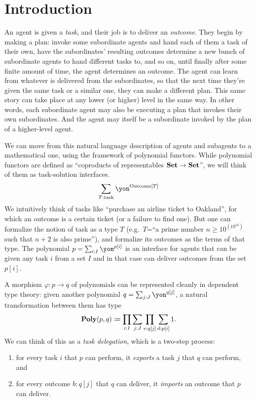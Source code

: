 \chapter{Introduction}\label{sec:intro}

An agent is given a \emph{task}, and their job is to deliver an \emph{outcome}. They begin by making a plan: invoke some subordinate agents and hand each of them a task of their own, have the subordinates' resulting outcomes determine a new bunch of subordinate agents to hand different tasks to, and so on, until finally after some finite amount of time, the agent determines an outcome. The agent can learn from whatever is delivered from the subordinates, so that the next time they're given the same task or a similar one, they can make a different plan. This same story can take place at any lower (or higher) level in the same way. In other words, each subordinate agent may also be executing a plan that invokes their own subordinates. And the agent may itself be a subordinate invoked by the plan of a higher-level agent.

We can move from this natural language description of agents and subagents to a mathematical one, using the framework of polynomial functors. While polynomial functors are defined as ``coproducts of representables $\mathbf{Set}\to\mathbf{Set}$'', we will think of them as task-solution interfaces.
\[
\sum_{T:\text{task}}\yon^{\text{Outcome}[T]}
\]
We intuitively think of tasks like ``purchase an airline ticket to Oakland'', for which an outcome is a certain ticket (or a failure to find one). But one can formalize the notion of task as a type $T$ (e.g.\ $T$=``a prime number $n\geq10^{(10^{10})}$ such that $n+2$ is also prime''), and formalize its outcomes as the terms of that type. The polynomial $p=\sum_{i:I}\yon^{p[i]}$ is an interface for agents that can be given any task $i$ from a set $I$ and in that case can deliver outcomes from the set $p[i]$.

A morphism $\varphi\colon p\to q$ of polynomials can be represented cleanly in dependent type theory: given another polynomial $q=\sum_{j:J}\yon^{q[j]}$, a natural transformation between them has type
\[
\mathbf{Poly}(p,q)\coloneqq\prod_{i:I}\sum_{j:J}\prod_{e:q[j]}\sum_{d:p[i]}1.
\]
We can think of this as a \emph{task delegation}, which is a two-step process: 
\begin{enumerate}
\item for every task $i$ that $p$ can perform, it \emph{exports} a task $j$ that $q$ can perform, and
\item for every outcome $b:q[j]$ that $q$ can deliver, it \emph{imports} an outcome that $p$ can deliver.
\end{enumerate}

